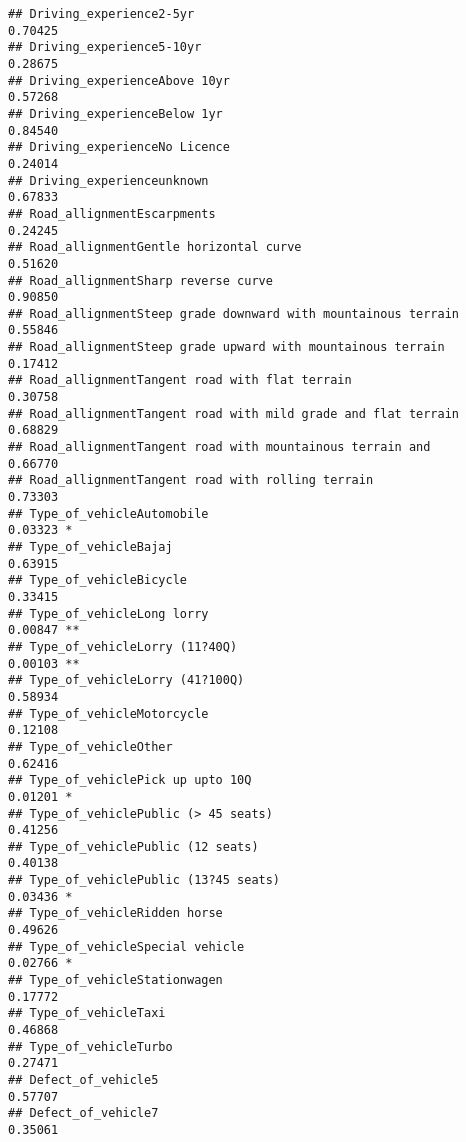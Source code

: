 \documentclass[
]{article}
\begin{document}
\begin{verbatim}
## Driving_experience2-5yr                                       0.70425    
## Driving_experience5-10yr                                      0.28675    
## Driving_experienceAbove 10yr                                  0.57268    
## Driving_experienceBelow 1yr                                   0.84540    
## Driving_experienceNo Licence                                  0.24014    
## Driving_experienceunknown                                     0.67833    
## Road_allignmentEscarpments                                    0.24245    
## Road_allignmentGentle horizontal curve                        0.51620    
## Road_allignmentSharp reverse curve                            0.90850    
## Road_allignmentSteep grade downward with mountainous terrain  0.55846    
## Road_allignmentSteep grade upward with mountainous terrain    0.17412    
## Road_allignmentTangent road with flat terrain                 0.30758    
## Road_allignmentTangent road with mild grade and flat terrain  0.68829    
## Road_allignmentTangent road with mountainous terrain and      0.66770    
## Road_allignmentTangent road with rolling terrain              0.73303    
## Type_of_vehicleAutomobile                                     0.03323 *  
## Type_of_vehicleBajaj                                          0.63915    
## Type_of_vehicleBicycle                                        0.33415    
## Type_of_vehicleLong lorry                                     0.00847 ** 
## Type_of_vehicleLorry (11?40Q)                                 0.00103 ** 
## Type_of_vehicleLorry (41?100Q)                                0.58934    
## Type_of_vehicleMotorcycle                                     0.12108    
## Type_of_vehicleOther                                          0.62416    
## Type_of_vehiclePick up upto 10Q                               0.01201 *  
## Type_of_vehiclePublic (> 45 seats)                            0.41256    
## Type_of_vehiclePublic (12 seats)                              0.40138    
## Type_of_vehiclePublic (13?45 seats)                           0.03436 *  
## Type_of_vehicleRidden horse                                   0.49626    
## Type_of_vehicleSpecial vehicle                                0.02766 *  
## Type_of_vehicleStationwagen                                   0.17772    
## Type_of_vehicleTaxi                                           0.46868    
## Type_of_vehicleTurbo                                          0.27471    
## Defect_of_vehicle5                                            0.57707    
## Defect_of_vehicle7                                            0.35061    

\end{verbatim}
\end{document}
